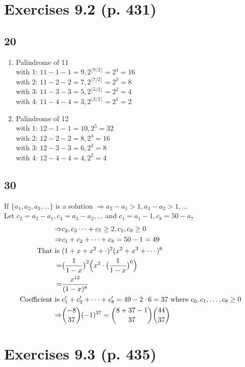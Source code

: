 \documentclass[a4paper]{article}
\begin{document}
\section{Exercises 9.2 (p. 431) }
\subsection{20}
\begin{enumerate}[label=(\alph*)]
    \item Palindrome of 11\\
    with 1: $11-1-1=9, 2^{\lfloor9/2\rfloor}=2^4=16$\\
    with 2: $11-2-2=7, 2^{\lfloor7/2\rfloor}=2^3=8$\\
    with 3: $11-3-3=5, 2^{\lfloor5/2\rfloor}=2^2=4$\\
    with 4: $11-4-4=3, 2^{\lfloor3/2\rfloor}=2^1=2$
    \item Palindrome of 12\\
    with 1: $12-1-1=10, 2^5=32$\\
    with 2: $12-2-2=8, 2^4=16$\\
    with 3: $12-3-3=6, 2^3=8$\\
    with 4: $12-4-4=4, 2^2=4$
\end{enumerate}

\subsection{30}
If $\{a_1,a_2,a_3,\ldots\}$ is a solution $\Rightarrow a_2-a_1>1,a_3-a_2>1,\ldots$\\
Let $c_2=a_2-a_1, c_3=a_3-a_2, \ldots$ and $c_1=a_1-1, c_8=50-a_7$
\begin{align*}
    \Rightarrow&c_2,c_3\cdots+c_7\geq2, c_1,c_8\geq0\\
    \Rightarrow&c_1+c_2+\cdots+c_8=50-1=49\\
    \text{That is }&(1+x+x^2+\cdot)^2(x^2+x^3+\cdots)^6\\
    =&\bigl(\frac{1}{1-x}\bigr)^2\Bigl(x^2\cdot\bigl(\frac{1}{1-x}\bigr)^6\Bigr)\\
    =&\frac{x^{12}}{(1-x)^8}\\
    \text{Coefficient is }&c_1'+c_2'+\cdots+c_8'=49-2\cdot6=37\text{ where }c_0,c_1,\ldots,c_8\geq 0\\
    \Rightarrow&\binom{-8}{37}(-1)^{37}=\binom{8+37-1}{37}\binom{44}{37}
\end{align*}
\section{Exercises 9.3 (p. 435)  }
\end{document}
